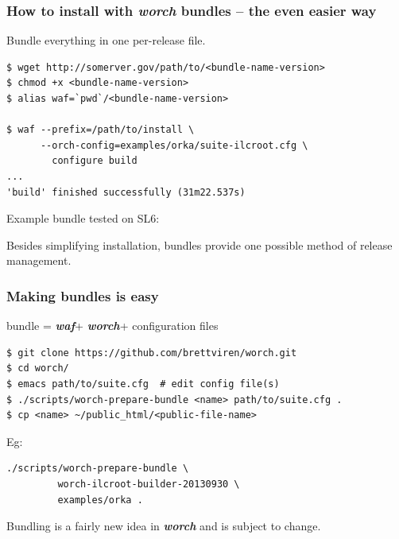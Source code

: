 \documentclass[xcolor=dvipsnames]{beamer}
\newcommand{\app}[1]{\textbf{\textit{#1}}\xspace}
\def\waf{\app{waf}}
\def\worch{\app{worch}}
\begin{document}
\begin{frame}[fragile]
  \frametitle{How to install with \worch{} bundles -- the even easier way}

  Bundle everything in one per-release file.

{\scriptsize
\begin{verbatim}
$ wget http://somerver.gov/path/to/<bundle-name-version>
$ chmod +x <bundle-name-version>
$ alias waf=`pwd`/<bundle-name-version>

$ waf --prefix=/path/to/install \
      --orch-config=examples/orka/suite-ilcroot.cfg \
        configure build
...
'build' finished successfully (31m22.537s)
\end{verbatim}
}

Example bundle tested on SL6:

Besides simplifying installation, bundles provide one possible method of release management.

\end{frame}

\begin{frame}[fragile]
  \frametitle{Making bundles is easy}

  \begin{center}
    bundle = \waf + \worch + configuration files    
  \end{center}

{
  \small
\begin{verbatim}
$ git clone https://github.com/brettviren/worch.git
$ cd worch/
$ emacs path/to/suite.cfg  # edit config file(s)
$ ./scripts/worch-prepare-bundle <name> path/to/suite.cfg .
$ cp <name> ~/public_html/<public-file-name>
\end{verbatim}
}

Eg:

\begin{verbatim}
./scripts/worch-prepare-bundle \
         worch-ilcroot-builder-20130930 \
         examples/orka .
\end{verbatim}

Bundling is a fairly new idea in \worch and is subject to change.

\end{frame}
\end{document}
